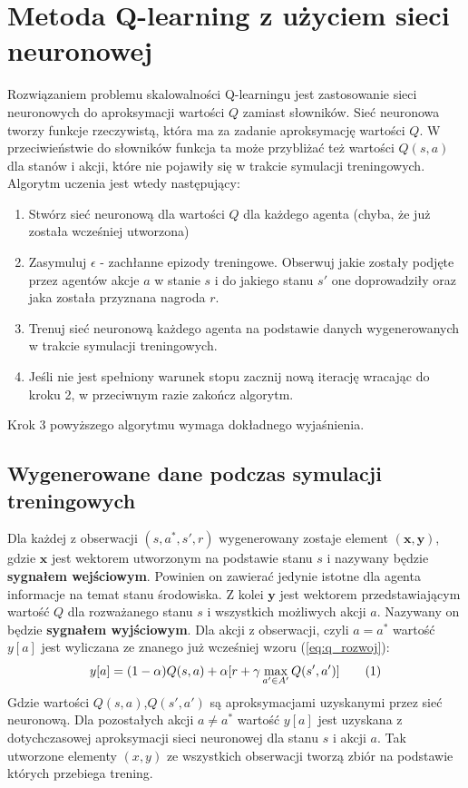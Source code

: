 \documentclass[12pt]{book}
\theoremstyle{plain}
\newcommand\addtag{\refstepcounter{equation}
\renewcommand{\labelenumii}{\theenumii}
\renewcommand{\theenumii}{\theenumi.\arabic{enumii}.}
\tag{\theequation}}
\newcommand{\myref}[1]{(\ref{#1})}
\begin{document}
\section{Metoda Q-learning z użyciem sieci neuronowej} \label{learning:DQN_single_agent}
Rozwiązaniem problemu skalowalności Q-learningu jest zastosowanie sieci neuronowych do aproksymacji wartości $Q$ zamiast słowników. Sieć neuronowa tworzy funkcje rzeczywistą, która ma za zadanie aproksymację wartości $Q$. W przeciwieństwie do słowników funkcja ta może przybliżać też wartości $Q(s,a)$ dla stanów i akcji, które nie pojawiły się w trakcie symulacji treningowych. Algorytm uczenia jest wtedy następujący:
\begin{enumerate}
	\item Stwórz sieć neuronową dla wartości $Q$ dla każdego agenta (chyba, że już została wcześniej utworzona)
	\item Zasymuluj $\epsilon$ - zachłanne epizody treningowe. Obserwuj jakie zostały podjęte przez agentów akcje $a$ w stanie $s$ i do jakiego stanu $s'$ one doprowadziły oraz jaka została przyznana nagroda $r$.
	\item Trenuj sieć neuronową każdego agenta na podstawie danych wygenerowanych w trakcie symulacji treningowych.
	\item Jeśli nie jest spełniony warunek stopu zacznij nową iterację wracając do kroku 2, w przeciwnym razie zakończ algorytm.
\end{enumerate}
Krok 3 powyższego algorytmu wymaga dokładnego wyjaśnienia.
\subsection{Wygenerowane dane podczas symulacji treningowych}
Dla każdej z obserwacji $(s,a^*,s',r)$ wygenerowany zostaje element $(\textbf{x},\textbf{y})$, gdzie $\textbf{x}$ jest wektorem utworzonym na podstawie stanu $s$ i nazywany będzie \textbf{sygnałem wejściowym}. Powinien on zawierać jedynie istotne dla agenta informacje na temat stanu środowiska. Z kolei $\textbf{y}$ jest wektorem przedstawiającym wartość $Q$ dla rozważanego stanu $s$ i wszystkich możliwych akcji $a$. Nazywany on będzie \textbf{sygnałem wyjściowym}. Dla akcji z obserwacji, czyli $a=a^*$ wartość $y[a]$ jest wyliczana ze znanego już wcześniej wzoru \myref{eq:q_rozwoj}:
\[ y[a]=(1-\alpha)Q(s,a) + \alpha [r + \gamma \max_{a' \in A'} Q(s',a')] \addtag \]
Gdzie wartości $Q(s,a)$,$Q(s',a')$ są aproksymacjami uzyskanymi przez sieć neuronową. \newline \newline Dla pozostałych akcji $a \neq a^*$ wartość $y[a]$ jest uzyskana z dotychczasowej aproksymacji sieci neuronowej dla stanu $s$ i akcji $a$. Tak utworzone elementy $(x,y)$ ze wszystkich obserwacji tworzą zbiór na podstawie których przebiega trening.
\end{document}
